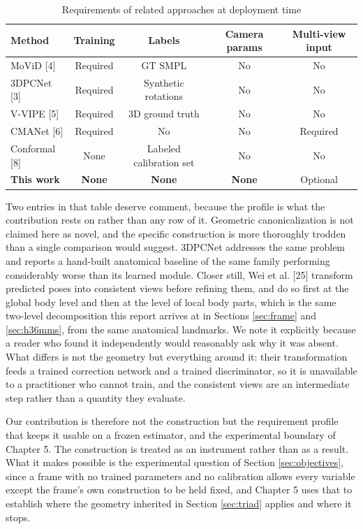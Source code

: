 \documentclass[12pt,a4paper]{report}
\begin{document}
\begin{table}[H]
\centering
\caption{Requirements of related approaches at deployment time}
\label{tab:requirements}
\begin{tabular}{|l|c|c|c|c|}
\hline
\textbf{Method} & \textbf{Training} & \textbf{Labels} & \textbf{Camera params} & \textbf{Multi-view input} \\
\hline
MoViD [4] & Required & GT SMPL & No & No \\
\hline
3DPCNet [3] & Required & Synthetic rotations & No & No \\
\hline
V-VIPE [5] & Required & 3D ground truth & No & No \\
\hline
CMANet [6] & Required & No & No & Required \\
\hline
Conformal [8] & None & Labeled calibration set & No & No \\
\hline
\textbf{This work} & \textbf{None} & \textbf{None} & \textbf{None} & Optional \\
\hline
\end{tabular}
\end{table}

Two entries in that table deserve comment, because the profile is what the contribution rests on rather than any row of it. Geometric canonicalization is not claimed here as novel, and the specific construction is more thoroughly trodden than a single comparison would suggest. 3DPCNet addresses the same problem and reports a hand-built anatomical baseline of the same family performing considerably worse than its learned module. Closer still, Wei et al. [25] transform predicted poses into consistent views before refining them, and do so first at the global body level and then at the level of local body parts, which is the same two-level decomposition this report arrives at in Sections \ref{sec:frame} and \ref{sec:h36mms}, from the same anatomical landmarks. We note it explicitly because a reader who found it independently would reasonably ask why it was absent. What differs is not the geometry but everything around it: their transformation feeds a trained correction network and a trained discriminator, so it is unavailable to a practitioner who cannot train, and the consistent views are an intermediate step rather than a quantity they evaluate.

Our contribution is therefore not the construction but the requirement profile that keeps it usable on a frozen estimator, and the experimental boundary of Chapter 5. The construction is treated as an instrument rather than as a result. What it makes possible is the experimental question of Section \ref{sec:objectives}, since a frame with no trained parameters and no calibration allows every variable except the frame's own construction to be held fixed, and Chapter 5 uses that to establish where the geometry inherited in Section \ref{sec:triad} applies and where it stops.
\end{document}

